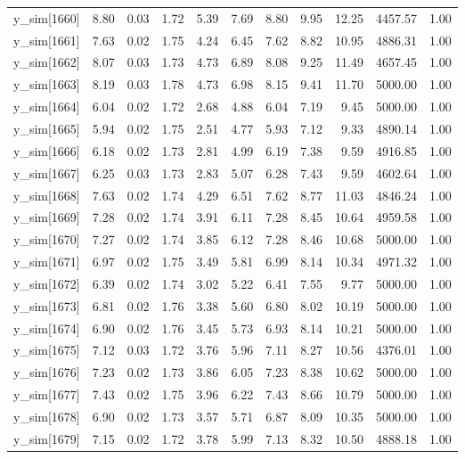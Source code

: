 \begin{table}[ht]
\begin{tabular}{rrrrrrrrrrr}
  y\_sim[1660] & 8.80 & 0.03 & 1.72 & 5.39 & 7.69 & 8.80 & 9.95 & 12.25 & 4457.57 & 1.00 \\ 
  y\_sim[1661] & 7.63 & 0.02 & 1.75 & 4.24 & 6.45 & 7.62 & 8.82 & 10.95 & 4886.31 & 1.00 \\ 
  y\_sim[1662] & 8.07 & 0.03 & 1.73 & 4.73 & 6.89 & 8.08 & 9.25 & 11.49 & 4657.45 & 1.00 \\ 
  y\_sim[1663] & 8.19 & 0.03 & 1.78 & 4.73 & 6.98 & 8.15 & 9.41 & 11.70 & 5000.00 & 1.00 \\ 
  y\_sim[1664] & 6.04 & 0.02 & 1.72 & 2.68 & 4.88 & 6.04 & 7.19 & 9.45 & 5000.00 & 1.00 \\ 
  y\_sim[1665] & 5.94 & 0.02 & 1.75 & 2.51 & 4.77 & 5.93 & 7.12 & 9.33 & 4890.14 & 1.00 \\ 
  y\_sim[1666] & 6.18 & 0.02 & 1.73 & 2.81 & 4.99 & 6.19 & 7.38 & 9.59 & 4916.85 & 1.00 \\ 
  y\_sim[1667] & 6.25 & 0.03 & 1.73 & 2.83 & 5.07 & 6.28 & 7.43 & 9.59 & 4602.64 & 1.00 \\ 
  y\_sim[1668] & 7.63 & 0.02 & 1.74 & 4.29 & 6.51 & 7.62 & 8.77 & 11.03 & 4846.24 & 1.00 \\ 
  y\_sim[1669] & 7.28 & 0.02 & 1.74 & 3.91 & 6.11 & 7.28 & 8.45 & 10.64 & 4959.58 & 1.00 \\ 
  y\_sim[1670] & 7.27 & 0.02 & 1.74 & 3.85 & 6.12 & 7.28 & 8.46 & 10.68 & 5000.00 & 1.00 \\ 
  y\_sim[1671] & 6.97 & 0.02 & 1.75 & 3.49 & 5.81 & 6.99 & 8.14 & 10.34 & 4971.32 & 1.00 \\ 
  y\_sim[1672] & 6.39 & 0.02 & 1.74 & 3.02 & 5.22 & 6.41 & 7.55 & 9.77 & 5000.00 & 1.00 \\ 
  y\_sim[1673] & 6.81 & 0.02 & 1.76 & 3.38 & 5.60 & 6.80 & 8.02 & 10.19 & 5000.00 & 1.00 \\ 
  y\_sim[1674] & 6.90 & 0.02 & 1.76 & 3.45 & 5.73 & 6.93 & 8.14 & 10.21 & 5000.00 & 1.00 \\ 
  y\_sim[1675] & 7.12 & 0.03 & 1.72 & 3.76 & 5.96 & 7.11 & 8.27 & 10.56 & 4376.01 & 1.00 \\ 
  y\_sim[1676] & 7.23 & 0.02 & 1.73 & 3.86 & 6.05 & 7.23 & 8.38 & 10.62 & 5000.00 & 1.00 \\ 
  y\_sim[1677] & 7.43 & 0.02 & 1.75 & 3.96 & 6.22 & 7.43 & 8.66 & 10.79 & 5000.00 & 1.00 \\ 
  y\_sim[1678] & 6.90 & 0.02 & 1.73 & 3.57 & 5.71 & 6.87 & 8.09 & 10.35 & 5000.00 & 1.00 \\ 
  y\_sim[1679] & 7.15 & 0.02 & 1.72 & 3.78 & 5.99 & 7.13 & 8.32 & 10.50 & 4888.18 & 1.00 \\ 

\end{tabular}
\end{table}
